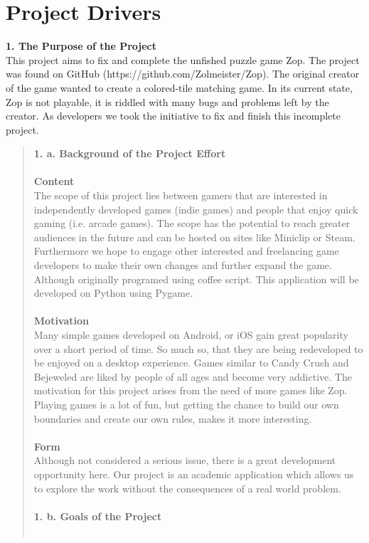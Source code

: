\documentclass[12pt]{article}
\begin{document}
\section*{Project Drivers}
\textbf{1. The Purpose of the Project}\\
This project aims to fix and complete the unfished puzzle game Zop. The project was found on GitHub (https://github.com/Zolmeister/Zop). The original creator of the game wanted to create a colored-tile matching game. In its current state, Zop is not playable, it is riddled with many bugs and problems left by the creator. As developers we took the initiative to fix and finish this incomplete project.
\begin{quote}
 \textbf{1. a. Background of the Project Effort}\\\\
 \textbf{Content}\\
 The scope of this project lies between gamers that are interested in independently developed games (indie games) and people that enjoy quick gaming (i.e. arcade games). The scope has the potential to reach greater audiences in the future and can be hosted on sites like Miniclip or Steam. Furthermore we hope to engage other interested and freelancing game developers to make their own changes and further expand the game. Although originally programed using coffee script. This application will be developed on Python using Pygame.\\\\
 \textbf{Motivation}\\
 Many simple games developed on Android, or iOS gain great popularity over a short period of time. So much so, that they are being redeveloped to be enjoyed on a desktop experience. Games similar to Candy Crush and Bejeweled are liked by people of all ages and become very addictive. The motivation for this project arises from the need of more games like Zop. Playing games is a lot of fun, but getting the chance to build our own boundaries and create our own rules, makes it more interesting.\\\\
 \textbf{Form}\\
 Although not considered a serious issue, there is a great development opportunity here. Our project is an academic application which allows us to explore the work without the consequences of a real world problem.\\\\
 \textbf{1. b. Goals of the Project}\\\\

\end{quote}
\end{document}
